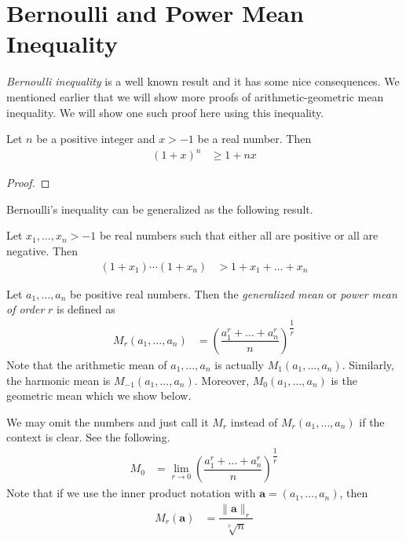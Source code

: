 \documentclass{subfile}
\begin{document}
	\section{Bernoulli and Power Mean Inequality}\label{sec:powermean}
	\emph{Bernoulli inequality} is a well known result and it has some nice consequences. We mentioned earlier that we will show more proofs of arithmetic-geometric mean inequality. We will show one such proof here using this inequality.
		\begin{theorem}
			Let $n$ be a positive integer and $x>-1$ be a real number. Then
				\begin{align*}
					(1+x)^n
						& \geq1+nx
				\end{align*}
		\end{theorem}
	
		\begin{proof}
			
		\end{proof}
	Bernoulli's inequality can be generalized as the following result.
		\begin{theorem}
			Let $x_1,\ldots,x_n>-1$ be real numbers such that either all are positive or all are negative. Then
				\begin{align*}
					(1+x_1)\cdots(1+x_n)
						& > 1+x_1+\ldots+x_n
				\end{align*}
		\end{theorem}%
	
		\begin{definition}
			Let $a_1,\ldots,a_n$ be positive real numbers. Then the \emph{generalized mean} or \emph{power mean of order} $r$ is defined as
				\begin{align*}
					M_r(a_1,\ldots,a_n)
						& = \left(\dfrac{a_1^r+\ldots+a_n^r}{n}\right)^{\dfrac{1}{r}}
				\end{align*}
			Note that the arithmetic mean of $a_1,\ldots,a_n$ is actually $M_1(a_1,\ldots,a_n)$. Similarly, the harmonic mean is $M_{-1}(a_1,\ldots,a_n)$. Moreover, $M_0(a_1,\ldots,a_n)$ is the geometric mean which we show below.
		\end{definition}
	We may omit the numbers and just call it $M_r$ instead of $M_r(a_1,\ldots,a_n)$ if the context is clear. See the following.
		\begin{align*}
			M_0
				& = \lim\limits_{r\to0}\left(\dfrac{a_1^r+\ldots+a_n^r}{n}\right)^{\dfrac{1}{r}}
		\end{align*}
	Note that if we use the inner product notation with $\mathbf{a}=(a_1,\ldots,a_n)$, then
		\begin{align*}
			M_r(\mathbf{a})
				& = \dfrac{\|\mathbf{a}\|_{r}}{\sqrt[r]{n}}
		\end{align*}
	
\end{document}
